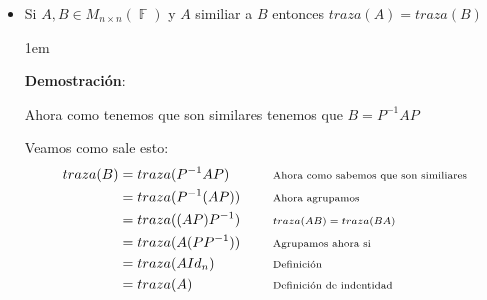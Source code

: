 \documentclass[12pt, fleqn]{report}                             %
\newenvironment{SmallIndentation}[1][0.75em]                    %
        {\begin{adjustwidth}{#1}{}\begin{footnotesize}}             %
        {\end{footnotesize}\end{adjustwidth}}                       %
\DeclareMathOperator \Space {\quad}                             %
\newcommand \Remember[1]{\Space\text{\scriptsize{#1}}}          %
\theoremstyle{break}                                            %
\DeclareMathOperator \GenericField {\mathbb{F}}                 %
\begin{document}
\begin{itemize}
\begin{SmallIndentation}[1em]
                            Así de sencillo
                        
                        \end{SmallIndentation}

                    \clearpage

                    \item
                        Si $A, B \in M_{n \times n}(\GenericField)$ y $A$ similiar a $B$ entonces $traza(A) = traza(B)$
                        \begin{SmallIndentation}[1em]
                            \textbf{Demostración}:

                            Ahora como tenemos que son similares tenemos que $B = P^{-1}AP$
                            
                            Veamos como sale esto:
                            \begin{align*}
                                traza(B)
                                    &= traza(P^{-1}AP)                                          
                                        && \Remember{Ahora como sabemos que son similiares}     \\
                                    &= traza(P^{-1}(AP))                                          
                                        && \Remember{Ahora agrupamos}                           \\
                                    &= traza((AP)P^{-1})                                          
                                        && \Remember{$traza(AB) = traza(BA)$}                   \\
                                    &= traza(A(PP^{-1}))                                          
                                        && \Remember{Agrupamos ahora si}                        \\
                                    &= traza(AId_n)                                          
                                        && \Remember{Definición}                                \\
                                    &= traza(A)                                        
                                        && \Remember{Definición de indentidad}
                            \end{align*}
                        
                        \end{SmallIndentation}
                            

                \end{itemize}
\end{document}
